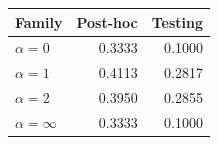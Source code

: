 \begin{tabular}{lrr}
\toprule
Family & Post-hoc & Testing \\
\midrule
$\alpha = 0$ & 0.3333 & 0.1000 \\
$\alpha = 1$ & 0.4113 & 0.2817 \\
$\alpha = 2$ & 0.3950 & 0.2855 \\
$\alpha = \infty$ & 0.3333 & 0.1000 \\
\bottomrule
\end{tabular}
